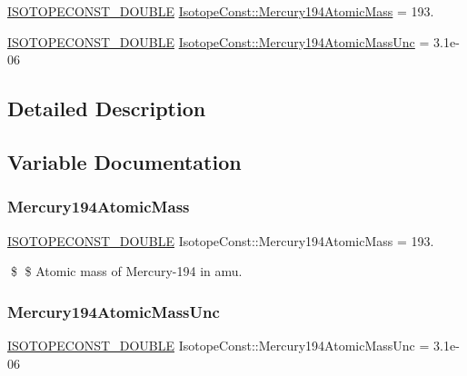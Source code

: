\begin{DoxyCompactItemize}
\item 
\mbox{\hyperlink{group___isotope_const-_macros_ga8f45a7272ce02c0b4c65c44636ed719a}{I\+S\+O\+T\+O\+P\+E\+C\+O\+N\+S\+T\+\_\+\+D\+O\+U\+B\+LE}} \mbox{\hyperlink{group___isotope_const-_mercury-_hg194_ga97d8f182b58e9788706c22e562201442}{Isotope\+Const\+::\+Mercury194\+Atomic\+Mass}} = 193.
\item 
\mbox{\hyperlink{group___isotope_const-_macros_ga8f45a7272ce02c0b4c65c44636ed719a}{I\+S\+O\+T\+O\+P\+E\+C\+O\+N\+S\+T\+\_\+\+D\+O\+U\+B\+LE}} \mbox{\hyperlink{group___isotope_const-_mercury-_hg194_ga100dae2b93de37c0c8a1f1d0b32fa989}{Isotope\+Const\+::\+Mercury194\+Atomic\+Mass\+Unc}} = 3.\+1e-\/06
\end{DoxyCompactItemize}


\subsection{Detailed Description}


\subsection{Variable Documentation}
\mbox{\label{group___isotope_const-_mercury-_hg194_ga97d8f182b58e9788706c22e562201442}} 
\subsubsection{\texorpdfstring{Mercury194\+Atomic\+Mass}{Mercury194AtomicMass}}
{\footnotesize\ttfamily \mbox{\hyperlink{group___isotope_const-_macros_ga8f45a7272ce02c0b4c65c44636ed719a}{I\+S\+O\+T\+O\+P\+E\+C\+O\+N\+S\+T\+\_\+\+D\+O\+U\+B\+LE}} Isotope\+Const\+::\+Mercury194\+Atomic\+Mass = 193.}

\$ \$ Atomic mass of Mercury-\/194 in amu. \mbox{\label{group___isotope_const-_mercury-_hg194_ga100dae2b93de37c0c8a1f1d0b32fa989}} 
\subsubsection{\texorpdfstring{Mercury194\+Atomic\+Mass\+Unc}{Mercury194AtomicMassUnc}}
{\footnotesize\ttfamily \mbox{\hyperlink{group___isotope_const-_macros_ga8f45a7272ce02c0b4c65c44636ed719a}{I\+S\+O\+T\+O\+P\+E\+C\+O\+N\+S\+T\+\_\+\+D\+O\+U\+B\+LE}} Isotope\+Const\+::\+Mercury194\+Atomic\+Mass\+Unc = 3.\+1e-\/06}

